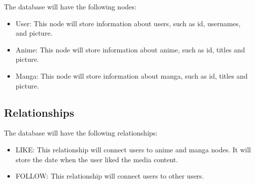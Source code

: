 The database will have the following nodes:
\begin{itemize}
    \item User: This node will store information about users, such as id, usernames, and picture.
    \item Anime: This node will store information about anime, such as id, titles and picture.
    \item Manga: This node will store information about manga, such as id, titles and picture.
\end{itemize}

\subsection*{Relationships}

The database will have the following relationships:
\begin{itemize}
    \item LIKE\@: This relationship will connect users to anime and manga nodes. It will store the date when the user liked the media content.
    \item FOLLOW\@: This relationship will connect users to other users. 
\end{itemize}

